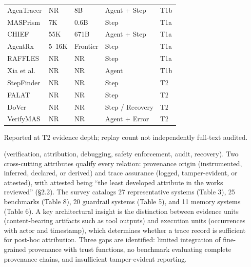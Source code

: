 \documentclass[preprint,12pt]{elsarticle}
\begin{document}
\begin{table}[!tbp]
\begin{tabular}{@{}Y{.226\linewidth}Y{.154\linewidth}Y{.156\linewidth}Y{.287\linewidth}Y{.096\linewidth}@{}}
AgenTracer & NR & 8B & Agent + Step & T1b \\
MASPrism & 7K & 0.6B & Step & T1a \\
CHIEF & 55K & 671B & Agent + Step & T1a \\
AgentRx & 5--16K & Frontier & Step & T1a \\
RAFFLES & NR & NR & Step & T1a \\
Xia et al. & NR & NR & Agent & T1b \\
StepFinder & NR & NR & Step & T2 \\
FALAT & NR & NR & Step & T2 \\
DoVer & NR & NR & Step / Recovery & T2 \\
VerifyMAS & NR & NR & Agent + Error & T2 \\
\bottomrule
\end{tabular}
\par\smallskip\raggedright\scriptsize *Reported at T2 evidence depth; replay count not independently full-text audited.
\endgroup
\end{table}
(verification, attribution, debugging, safety enforcement, audit, recovery). Two cross-cutting attributes qualify every relation: provenance origin (instrumented, inferred, declared, or derived) and trace assurance (logged, tamper-evident, or attested), with attested being ``the least developed attribute in the works reviewed'' (\S{}2.2). The survey catalogs 27 representative systems (Table 3), 25 benchmarks (Table 8), 20 guardrail systems (Table 5), and 11 memory systems (Table 6). A key architectural insight is the distinction between evidence units (content-bearing artifacts such as tool outputs) and execution units (occurrences with actor and timestamp), which determines whether a trace record is sufficient for post-hoc attribution. Three gaps are identified: limited integration of fine-grained provenance with trust functions, no benchmark evaluating complete provenance chains, and insufficient tamper-evident reporting.
\end{document}
